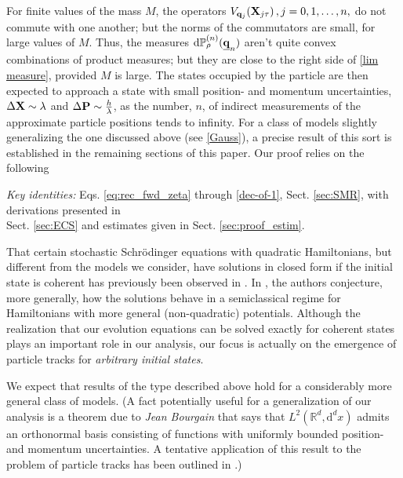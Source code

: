 \documentclass[11pt]{article}
\renewcommand{\d}{{\mathrm d}}
\begin{document}
 For finite values of the mass $M$, the operators  $V_{{\bf{q}}_{j}}({\bf{X}}_{j \tau})\,, j= 0,1,\dots, n,$ do not commute with one another; but the norms of the commutators are small, for large values of $M$. Thus, the measures 
 $\d\mathbb{P}^{(n)}_{\rho}(\underline{{\bf{q}}}_{n})$ aren't quite convex combinations of 
 product measures; but they are close to the right side of \eqref{lim measure}, provided $M$ is large. 
 The states occupied by the particle are then expected to approach a state with small
position- and momentum uncertainties, $\Delta {\bf{X}} \sim \lambda$ and $\Delta {\bf{P}} \sim \frac{h}{\lambda}$, 
as the number, $n$, of indirect measurements of the approximate particle positions tends to infinity. 
For a class of models slightly generalizing the one discussed above (see \eqref{Gauss}), 
a precise result of this sort is established in the remaining sections of this paper. Our proof relies on the following
\begin{center} 
\textit{Key identities:} Eqs. \eqref{eq:rec_fwd_zeta} through \eqref{dec-of-1}, Sect. \ref{sec:SMR}, with derivations 
presented in\\ Sect. \ref{sec:ECS} and estimates given in Sect. \ref{sec:proof_estim}. 
\end{center}
That certain stochastic Schr\"{o}dinger equations with quadratic Hamiltonians, but different from the models we consider, have solutions in closed form if the initial state is coherent has previously been observed in \cite{BK, BDK, BBJ}. In \cite{BBJ}, the authors conjecture, more generally, how the solutions behave in a semiclassical regime for Hamiltonians with more general (non-quadratic) potentials. Although the realization that our evolution equations can be solved exactly for coherent states  plays an important role in our analysis, our focus is actually on the emergence of particle tracks for \textit{arbitrary initial states}.

We expect that results of the type described above hold for a considerably more general class of models. 
(A fact potentially useful for a generalization of our analysis is a theorem due to \textit{Jean Bourgain} \cite{Bourgain} 
that says that $L^{2}(\mathbb{R}^{d}, \d^{d}x)$ admits an orthonormal basis consisting of functions with uniformly 
bounded position- and momentum uncertainties.  A tentative application of this result to the problem of particle 
tracks has been outlined in \cite{BFF}.)
\end{document}
